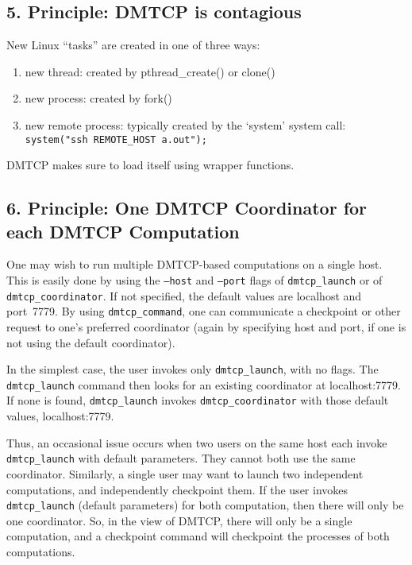 \documentclass{article}
\begin{document}
\subsection*{5. Principle:  DMTCP is contagious}

New Linux ``tasks'' are created in one of three ways:
\begin{enumerate}
  \item new thread: created by pthread\_create() or clone()
  \item new process: created by fork()
  \item new remote process: typically created by the `system' system call: \\
	{\tt system("ssh REMOTE\_HOST a.out");}
\end{enumerate}

DMTCP makes sure to load itself using wrapper functions.

\newpage


\subsection*{6. Principle:  One DMTCP Coordinator for each DMTCP Computation}

One may wish to run multiple DMTCP-based computations on a single host.
This is easily done by using the {\tt --host} and {\tt --port} flags
of {\tt dmtcp\_launch} or of {\tt dmtcp\_coordinator}.  If not specified,
the default values are localhost and port~7779.  By using {\tt dmtcp\_command},
one can communicate a checkpoint or other request to one's
preferred coordinator (again by specifying host and port, if one is
not using the default coordinator).

In the simplest case, the user invokes only {\tt dmtcp\_launch}, with no
flags.  The {\tt dmtcp\_launch} command then looks for an existing
coordinator at localhost:7779.  If none is found, {\tt dmtcp\_launch}
invokes {\tt dmtcp\_coordinator} with those default values, localhost:7779.

Thus, an occasional issue occurs when two users on the same host each
invoke {\tt dmtcp\_launch} with default parameters.  They cannot both use
the same coordinator.  Similarly, a single user may want to launch two
independent computations, and independently checkpoint them.  If the user
invokes {\tt dmtcp\_launch} (default parameters) for both computation,
then there will only be one coordinator.  So, in the view of DMTCP,
there will only be a single computation, and a checkpoint command will
checkpoint the processes of both computations.
\end{document}

